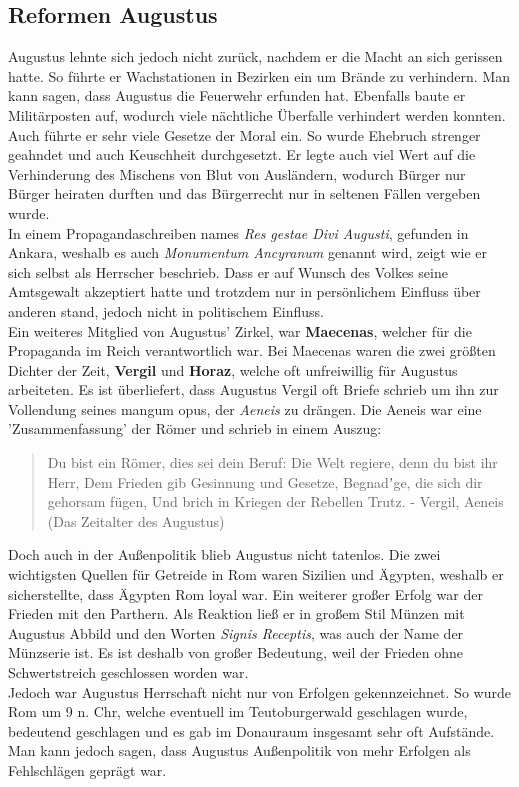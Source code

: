 \documentclass{article}
\begin{document}
	\subsection{Reformen Augustus}
	Augustus lehnte sich jedoch nicht zurück, nachdem er die Macht an sich gerissen hatte. So führte er Wachstationen in Bezirken ein um Brände zu verhindern. Man kann sagen, dass Augustus die Feuerwehr erfunden hat. Ebenfalls baute er Militärposten auf, wodurch viele nächtliche Überfalle verhindert werden konnten. Auch führte er sehr viele Gesetze der Moral ein. So wurde Ehebruch strenger geahndet und auch Keuschheit durchgesetzt. Er legte auch viel Wert auf die Verhinderung des Mischens von Blut von Ausländern, wodurch Bürger nur Bürger heiraten durften und das Bürgerrecht nur in seltenen Fällen vergeben wurde. \\
	In einem Propagandaschreiben names \textit{Res gestae Divi Augusti}, gefunden in Ankara, weshalb es auch \textit{Monumentum Ancyranum} genannt wird, zeigt wie er sich selbst als Herrscher beschrieb. Dass er auf Wunsch des Volkes seine Amtsgewalt akzeptiert hatte und trotzdem nur in persönlichem Einfluss über anderen stand, jedoch nicht in politischem Einfluss. \\
	Ein weiteres Mitglied von Augustus' Zirkel, war \textbf{Maecenas}, welcher für die Propaganda im Reich verantwortlich war. Bei Maecenas waren die zwei größten Dichter der Zeit, \textbf{Vergil} und \textbf{Horaz}, welche oft unfreiwillig für Augustus arbeiteten. Es ist überliefert, dass Augustus Vergil oft Briefe schrieb um ihn zur Vollendung seines mangum opus, der \textit{Aeneis} zu drängen. Die Aeneis war eine 'Zusammenfassung' der Römer und schrieb in einem Auszug:
	\begin{quote}
	Du bist ein Römer, dies sei dein Beruf: Die Welt regiere, denn du bist ihr Herr, Dem Frieden gib Gesinnung und Gesetze, Begnadʼge, die sich dir gehorsam fügen, Und brich in Kriegen der Rebellen Trutz. - Vergil, Aeneis (Das Zeitalter des Augustus)
	\end{quote}
	Doch auch in der Außenpolitik blieb Augustus nicht tatenlos. Die zwei wichtigsten Quellen für Getreide in Rom waren Sizilien und Ägypten, weshalb er sicherstellte, dass Ägypten Rom loyal war. Ein weiterer großer Erfolg war der Frieden mit den Parthern. Als Reaktion ließ er in großem Stil Münzen mit Augustus Abbild und den Worten \textit{Signis Receptis}, was auch der Name der Münzserie ist. Es ist deshalb von großer Bedeutung, weil der Frieden ohne Schwertstreich geschlossen worden war. \\
	Jedoch war Augustus Herrschaft nicht nur von Erfolgen gekennzeichnet. So wurde Rom um 9 n. Chr, welche eventuell im Teutoburgerwald geschlagen wurde, bedeutend geschlagen und es gab im Donauraum insgesamt sehr oft Aufstände. Man kann jedoch sagen, dass Augustus Außenpolitik von mehr Erfolgen als Fehlschlägen geprägt war. \\
\end{document}
